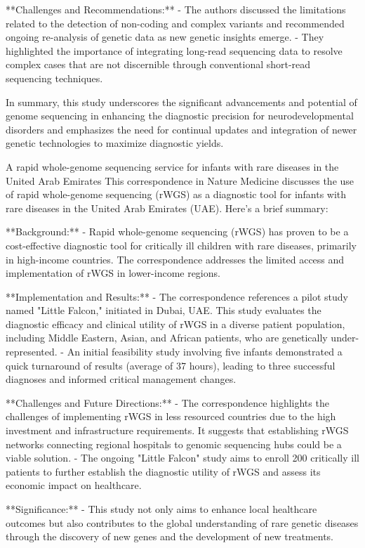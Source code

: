 **Challenges and Recommendations:**
- The authors discussed the limitations related to the detection of non-coding and complex variants and recommended ongoing re-analysis of genetic data as new genetic insights emerge.
- They highlighted the importance of integrating long-read sequencing data to resolve complex cases that are not discernible through conventional short-read sequencing techniques.

In summary, this study underscores the significant advancements and potential of genome sequencing in enhancing the diagnostic precision for neurodevelopmental disorders and emphasizes the need for continual updates and integration of newer genetic technologies to maximize diagnostic yields.


\citep{abou2023rapid}
A rapid whole-genome sequencing service for infants with rare diseases in the United Arab Emirates
This correspondence in Nature Medicine discusses the use of rapid whole-genome sequencing (rWGS) as a diagnostic tool for infants with rare diseases in the United Arab Emirates (UAE). Here's a brief summary:

**Background:**
- Rapid whole-genome sequencing (rWGS) has proven to be a cost-effective diagnostic tool for critically ill children with rare diseases, primarily in high-income countries. The correspondence addresses the limited access and implementation of rWGS in lower-income regions.

**Implementation and Results:**
- The correspondence references a pilot study named "Little Falcon," initiated in Dubai, UAE. This study evaluates the diagnostic efficacy and clinical utility of rWGS in a diverse patient population, including Middle Eastern, Asian, and African patients, who are genetically under-represented.
- An initial feasibility study involving five infants demonstrated a quick turnaround of results (average of 37 hours), leading to three successful diagnoses and informed critical management changes.

**Challenges and Future Directions:**
- The correspondence highlights the challenges of implementing rWGS in less resourced countries due to the high investment and infrastructure requirements. It suggests that establishing rWGS networks connecting regional hospitals to genomic sequencing hubs could be a viable solution.
- The ongoing "Little Falcon" study aims to enroll 200 critically ill patients to further establish the diagnostic utility of rWGS and assess its economic impact on healthcare.

**Significance:**
- This study not only aims to enhance local healthcare outcomes but also contributes to the global understanding of rare genetic diseases through the discovery of new genes and the development of new treatments.

